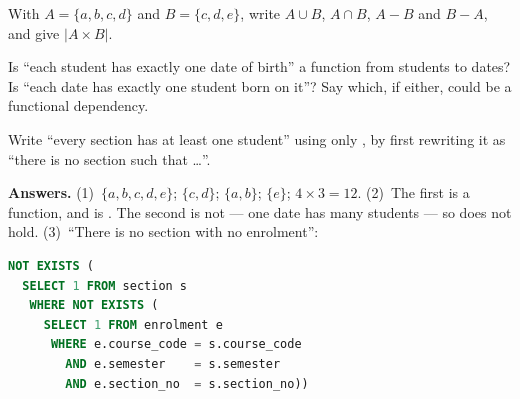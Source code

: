 \begin{conceptbox}
\begin{tightnum}
  \item With $A = \{a, b, c, d\}$ and $B = \{c, d, e\}$, write $A \cup B$,
        $A \cap B$, $A - B$ and $B - A$, and give $|A \times B|$.
  \item Is ``each student has exactly one date of birth'' a function from
        students to dates? Is ``each date has exactly one student born on
        it''? Say which, if either, could be a functional dependency.
  \item Write ``every section has at least one student'' using only
        , by first rewriting it as ``there is no section
        such that \dots''.
\end{tightnum}

\smallskip
\textbf{Answers.} (1)~$\{a,b,c,d,e\}$; $\{c,d\}$; $\{a,b\}$; $\{e\}$;
$4 \times 3 = 12$. (2)~The first is a function, and is
. The second is not --- one date has many
students --- so  does not hold. (3)~``There is no
section with no enrolment'':
\begin{lstlisting}[language=sql]
NOT EXISTS (
  SELECT 1 FROM section s
   WHERE NOT EXISTS (
     SELECT 1 FROM enrolment e
      WHERE e.course_code = s.course_code
        AND e.semester    = s.semester
        AND e.section_no  = s.section_no))
\end{lstlisting}

\end{conceptbox}
